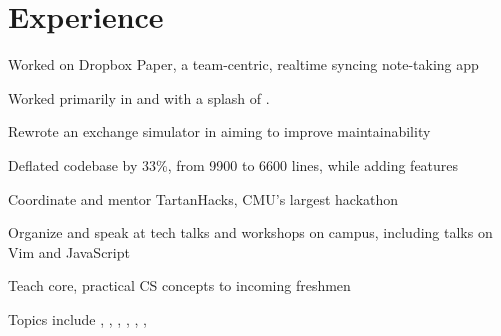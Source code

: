 \documentclass[]{deedy-resume-openfont}
\begin{document}
\hfill
\begin{minipage}[t]{0.66\textwidth}


\section{Experience}

\vspace{\topsep} %
\begin{tightemize}
\item Worked on Dropbox Paper, a team-centric, realtime syncing note-taking app
\item Worked primarily in  and  with a
  splash of .
\end{tightemize}
\sectionsep

\begin{tightemize}
\item Rewrote an exchange simulator in  aiming to improve
  maintainability
\item Deflated codebase by 33\%, from 9900 to 6600 lines, while adding features
\end{tightemize}
\sectionsep

\begin{tightemize}
\item Coordinate and mentor TartanHacks, CMU's largest hackathon
\item Organize and speak at tech talks and workshops on campus, including talks
  on Vim and JavaScript
\end{tightemize}
\sectionsep

\begin{tightemize}
\item Teach core, practical CS concepts to incoming freshmen
\item Topics include , ,
  , , , ,
\end{tightemize}
\sectionsep


\end{minipage}
\end{document}
